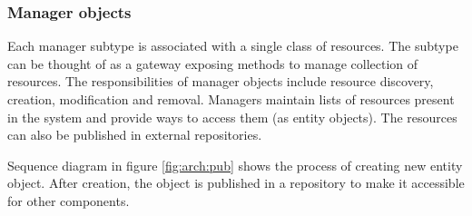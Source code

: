 \documentclass[11pt]{book}
\begin{document}
          \noindent
          \begin{minipage}{\textwidth}
            
          \end{minipage}


        \subsubsection{Manager objects}

          Each manager subtype is associated with a single class of resources. The subtype can be thought of as a
          gateway exposing methods to manage collection of resources. The responsibilities of manager objects include
          resource discovery, creation, modification and removal. Managers maintain lists of resources present in the
          system and provide ways to access them (as entity objects). The resources can also be published in external
          repositories. \\

          \noindent
          \begin{minipage}{\textwidth}
            
          \end{minipage}

          Sequence diagram in figure \ref{fig:arch:pub} shows the process of creating new entity object. After creation,
          the object is published in a repository to make it accessible for other components.
\end{document}
